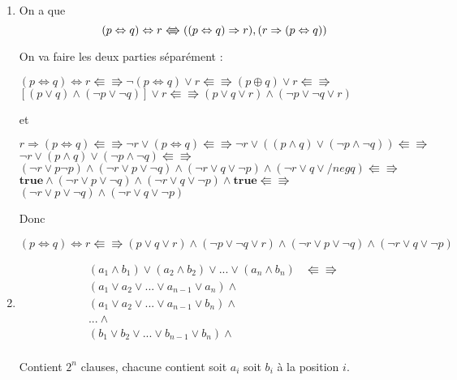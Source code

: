\begin{enumerate}
\begin{flushright}
\end{flushright}
	\item \hspace{1em}

On a que $$ (p \Leftrightarrow q) \Leftrightarrow r \Lleftarrow\!\!\!\!\Rrightarrow ((p\Leftrightarrow q) \Rightarrow r ) , ( r \Rightarrow (p \Leftrightarrow q)) $$

On va faire les deux parties séparément :
\begin{flushright}
	$(p \Leftrightarrow q) \Leftrightarrow r \Lleftarrow\!\!\!\!\Rrightarrow \neg(p \Leftrightarrow q) \lor  r \Lleftarrow\!\!\!\!\Rrightarrow (p \oplus q) \lor r \Lleftarrow\!\!\!\!\Rrightarrow$\\
	$ [ (p \lor q) \land (\neg p \lor \neg q) ] \lor r \Lleftarrow\!\!\!\!\Rrightarrow (p \lor q \lor r) \land (\neg p \lor \neg q \lor r) $\\
\end{flushright}
et
\begin{flushright}
	$ r \Rightarrow (p \Leftrightarrow q) \Lleftarrow\!\!\!\!\Rrightarrow \neg r \lor (p \Leftrightarrow q) \Lleftarrow\!\!\!\!\Rrightarrow  \neg r  \lor ( (p \land q) \lor (\neg p \land \neg q)) \Lleftarrow\!\!\!\!\Rrightarrow $\\
	$ \neg r \lor (p \land q) \lor (\neg p \land \neg q) \Lleftarrow\!\!\!\!\Rrightarrow $\\
	$ (\neg r \lor p \neg p) \land (\neg r \lor p \lor \neg q) \land (\neg r \lor q \lor \neg p) \land (\neg r \lor q \lor /neg q) \Lleftarrow\!\!\!\!\Rrightarrow $\\
	$ \textbf{true} \land (\neg r \lor p \lor \neg q) \land (\neg r \lor q \lor \neg p) \land  \textbf{true} \Lleftarrow\!\!\!\!\Rrightarrow $\\
	$ (\neg r \lor p \lor \neg q) \land (\neg r \lor q \lor \neg p) $\\
\end{flushright}
Donc
\begin{flushright}
	$(p \Leftrightarrow q ) \Leftrightarrow r \Lleftarrow\!\!\!\!\Rrightarrow (p \lor q \lor r) \land (\neg p \lor \neg q \lor r) \land (\neg r \lor p \lor \neg q) \land (\neg r \lor q \lor \neg p)$
\end{flushright}

	\item \hspace{1em}
\begin{align*}
	(a_1 \land b_1) \lor (a_2 \land b_2) \lor ... \lor (a_n \land b_n) & \Lleftarrow\!\!\!\!\Rrightarrow \\
	(a_1 \lor a_2 \lor ... \lor a_{n-1} \lor a_n) \land &\\
	(a_1 \lor a_2 \lor ... \lor a_{n-1} \lor b_n) \land &\\
	... \land &\\
	(b_1 \lor b_2 \lor ... \lor b_{n-1} \lor b_n) \land &\\
\end{align*}

Contient $2^n$ clauses, chacune contient soit $a_i$ soit $b_i$ à la position $i$.

\end{enumerate}


